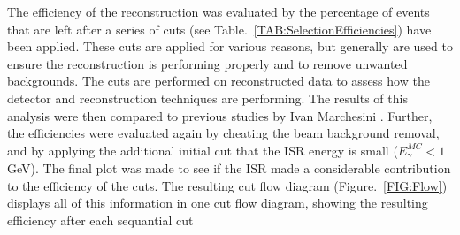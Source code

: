 The efficiency of the reconstruction was evaluated by the percentage of events that are left after a series of cuts (see Table.~\ref{TAB:SelectionEfficiencies}) have been applied. These cuts are applied for various reasons, but generally are used to ensure the reconstruction is performing properly and to remove unwanted backgrounds. The cuts are performed on reconstructed data to assess how the detector and reconstruction techniques are performing. The results of this analysis were then compared to previous studies by Ivan Marchesini  \cite{Marchesini:2011aka}. Further, the efficiencies were evaluated again by cheating the beam background removal, and by applying the additional initial cut that the ISR energy is small (${E}_{\gamma}^{MC} < 1$ GeV). The final plot was made to see if the ISR made a considerable contribution to the efficiency of the cuts. The resulting cut flow diagram (Figure.~\ref{FIG:Flow}) displays all of this information in one cut flow diagram, showing the resulting efficiency after each sequantial cut
\\\\
